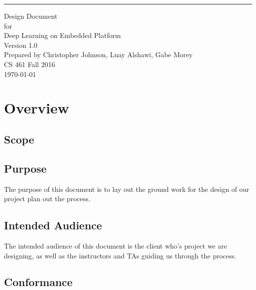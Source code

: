 \documentclass{scrreprt}
\date{}
\newcommand\blankpage{%
    \null
    \thispagestyle{empty}%
    \addtocounter{page}{-1}%
    \newpage}
\def\myversion{1.0 }
\begin{document}
\begin{flushright}
    \rule{16cm}{5pt}\vskip1cm
    \begin{bfseries}
        \Huge{Design Document}\\
        \vspace{1.9cm}
        for\\
        \vspace{1.9cm}
        Deep Learning on Embedded Platform\\
        \vspace{1.9cm}
        \LARGE{Version \myversion}\\
        \vspace{1.9cm}
        Prepared by Christopher Johnson, Luay Alshawi, Gabe Morey\\
        \vspace{1.9cm}
        CS 461 Fall 2016\\
        \vspace{1.9cm}
        \today\\
    \end{bfseries}
\end{flushright}
\afterpage{\blankpage}

\tableofcontents

\chapter{Overview}
\section{Scope}

\section{Purpose}

The purpose of this document is to lay out the ground work for the design of our project plan out the process.

\section{Intended Audience}

The intended audience of this document is the client who's project we are designing, as well as the instructors and TAs guiding us through the process.

\section{Conformance}
\end{document}
